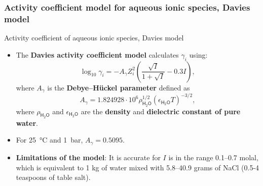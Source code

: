 \subsubsection{Activity coefficient model for aqueous ionic species, Davies model}
%
%
\begin{frame}{Activity coefficient of aqueous ionic species, Davies model}
\begin{itemize}[<+->]
\item The \alert{\textbf{Davies activity coefficient model} }calculates $\gamma_{i}$
using:
\[
\boxed{\log_{10}\gamma_{i}=-A_{\gamma}Z_{i}^{2}\left(\dfrac{\sqrt{I}}{1+\sqrt{I}}-0.3I\right)},
\]
where $A_{\gamma}$ is the \textbf{Debye–Hückel parameter} defined as
\[
A_{\gamma}=1.824928\cdot10^{6}\rho_{\mathsf{H_{2}O}}^{1/2}(\epsilon_{\mathsf{H_{2}O}}T)^{-3/2},
\]
%
where $\rho_{\mathsf{H_{2}O}}$ and $\epsilon_{\mathsf{H_{2}O}}$
are the \textbf{density} and \textbf{dielectric constant of pure water}. 
\item For 25~°C and 1~bar, $A_{\gamma}=0.5095$.
\item \textbf{Limitations of the model}: 
It is accurate for $I$ is in the range 0.1–0.7 molal, which is equivalent to 1 kg of water mixed with 5.8–40.9 grams of NaCl (0.5-4 teaspoons of table salt).
\end{itemize}
\end{frame}
%
%
